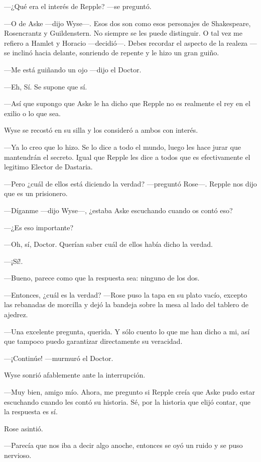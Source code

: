 {---¿Qué era el interés de Repple? ---se preguntó.}

{---O de Aske ---dijo Wyse---. Esos dos son como esos personajes de
	Shakespeare, Rosencrantz y Guildenstern. No siempre se les puede
	distinguir. O tal vez me refiero a Hamlet y Horacio ---decidió---. Debes
	recordar el aspecto de la realeza ---se inclinó hacia delante, sonriendo
de repente y le hizo un gran guiño.}

{---Me está guiñando un ojo ---dijo el Doctor.}

{---Eh, Sí. Se supone que sí.}

{---Así que supongo que Aske le ha dicho que Repple no es realmente el
rey en el exilio o lo que sea.}

{Wyse se recostó en su silla y los consideró a ambos con interés.}

{---Ya lo creo que lo hizo. Se lo dice a todo el mundo, luego les hace
	jurar que mantendrán el secreto. Igual que Repple les dice a todos que
es efectivamente el legitimo Elector de Dastaria.}

{---Pero ¿cuál de ellos está diciendo la verdad? ---preguntó Rose---.
Repple nos dijo que es un prisionero.}

{---Díganme ---dijo Wyse---, ¿estaba Aske escuchando cuando os contó
eso?}

{---¿Es eso importante?}

{---Oh, sí, Doctor. Querían saber cuál de ellos había dicho la verdad.}

{---¡Sí!.}

{---Bueno, parece como que la respuesta sea: ninguno de los dos.}

{---Entonces, ¿cuál es la verdad? ---Rose puso la tapa en su plato
	vacío, excepto las rebanadas de morcilla y dejó la bandeja sobre la mesa
al lado del tablero de ajedrez.}

{---Una excelente pregunta, querida. Y sólo cuento lo que me han dicho a
mi, así que tampoco puedo garantizar directamente su veracidad.}

{---¡Continúe! ---murmuró el Doctor.}

{Wyse sonrió afablemente ante la interrupción.}

{---Muy bien, amigo mío. Ahora, me pregunto si Repple creía que Aske
	pudo estar escuchando cuando les contó su historia. Sé, por la historia
que elijó contar, que la respuesta es sí.}

{Rose asintió.}

{---Parecía que nos iba a decir algo anoche, entonces se oyó un ruido y
se puso nervioso.}

